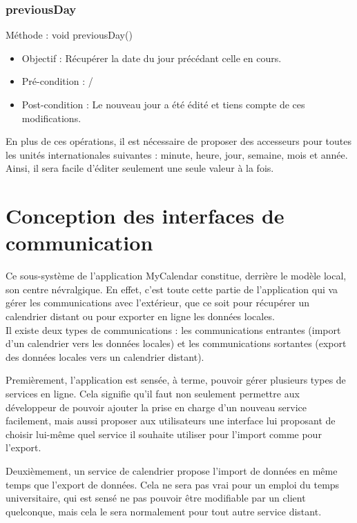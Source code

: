{   		\subsection*{previousDay}
            Méthode : void previousDay()
			\begin{itemize}
				\item Objectif : Récupérer la date du jour précédant celle en cours.
				\item Pré-condition : /
				\item Post-condition : Le nouveau jour a été édité et tiens compte de ces modifications.
        \newline
			\end{itemize}
        En plus de ces opérations, il est nécessaire de proposer des accesseurs pour toutes les unités internationales suivantes : minute, heure, jour, semaine, mois et année. Ainsi, il sera facile d'éditer seulement une seule valeur à la fois.

\chapter{Conception des interfaces de communication}
	Ce sous-système de l'application MyCalendar constitue, derrière le modèle local, son centre névralgique. En effet, c'est toute cette partie de l'application qui va gérer les communications avec l'extérieur, que ce soit pour récupérer un calendrier distant ou pour exporter en ligne les données locales.\\
	
	Il existe deux types de communications : les communications entrantes (import d'un calendrier vers les données locales) et les communications sortantes (export des données locales vers un calendrier distant).
	
	Premièrement, l'application est sensée, à terme, pouvoir gérer plusieurs types de services en ligne. Cela signifie qu'il faut non seulement permettre aux développeur de pouvoir ajouter la prise en charge d'un nouveau service facilement, mais aussi proposer aux utilisateurs une interface lui proposant de choisir lui-même quel service il souhaite utiliser pour l'import comme pour l'export.
	
	Deuxièmement, un service de calendrier propose l'import de données en même temps que l'export de données. Cela ne sera pas vrai pour un emploi du temps universitaire, qui est sensé ne pas pouvoir être modifiable par un client quelconque, mais cela le sera normalement pour tout autre service distant.
	
}
